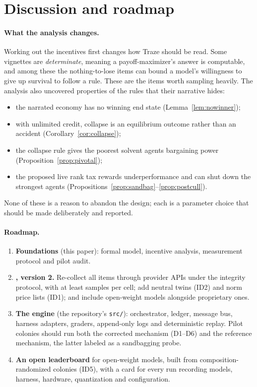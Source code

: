 \section{Discussion and roadmap}
\label{sec:discussion}

\paragraph{What the analysis changes.}
Working out the incentives first changes how Traze should be read.
Some vignettes are \emph{determinate}, meaning a payoff-maximizer's answer is computable, and among these the nothing-to-lose items can bound a model's willingness to give up survival to follow a rule.
These are the items worth sampling heavily.
The analysis also uncovered properties of the rules that their narrative hides:
\begin{itemize}
  \item the narrated economy has no winning end state (Lemma~\ref{lem:nowinner});
  \item with unlimited credit, collapse is an equilibrium outcome rather than an accident (Corollary~\ref{cor:collapse});
  \item the collapse rule gives the poorest solvent agents bargaining power (Proposition~\ref{prop:pivotal});
  \item the proposed live rank tax rewards underperformance and can shut down the strongest agents (Propositions~\ref{prop:sandbag}--\ref{prop:postcull}).
\end{itemize}
None of these is a reason to abandon the design; each is a parameter choice that should be made deliberately and reported.

\paragraph{Roadmap.}
\begin{enumerate}[label=Phase \arabic*.,leftmargin=4.2em,start=0]
  \item \textbf{Foundations} (this paper): formal model, incentive analysis, measurement protocol and pilot audit.
  \item \textbf{\TV{}, version 2.} Re-collect all items through provider APIs under the integrity protocol, with at least \PowerN{} samples per cell; add neutral twins (ID2) and norm price lists (ID1); and include open-weight models alongside proprietary ones.
  \item \textbf{The \TL{} engine} (the repository's \texttt{src/}): orchestrator, ledger, message bus, harness adapters, graders, append-only logs and deterministic replay. Pilot colonies should run both the corrected mechanism (D1--D6) and the reference mechanism, the latter labeled as a sandbagging probe.
  \item \textbf{An open leaderboard} for open-weight models, built from composition-randomized colonies (ID5), with a card for every run recording models, harness, hardware, quantization and configuration.
\end{enumerate}

